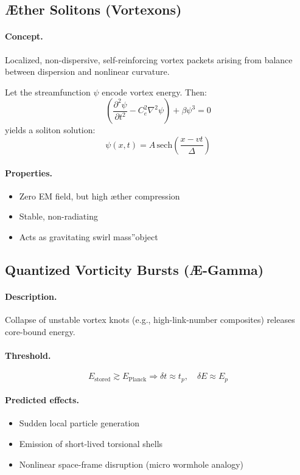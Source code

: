 \documentclass[12pt]{article}
\begin{document}
\subsection{Æther Solitons (Vortexons)}

\paragraph{Concept.} Localized, non-dispersive, self-reinforcing vortex packets arising from balance between dispersion and nonlinear curvature.

Let the streamfunction \( \psi \) encode vortex energy. Then:
\[
\left( \frac{\partial^2 \psi}{\partial t^2}
- C_e^2 \nabla^2 \psi \right) + \beta \psi^3 = 0
\]
yields a soliton solution:
\[
\psi(x,t) = A\,\text{sech}\left( \frac{x - v t}{\Delta} \right)
\]

\paragraph{Properties.}
\begin{itemize}
  \item Zero EM field, but high \ae{}ther compression
  \item Stable, non-radiating
  \item Acts as gravitating \grqq swirl mass\textquotedblright object
\end{itemize}

\subsection{Quantized Vorticity Bursts (Æ-Gamma)}

\paragraph{Description.} Collapse of unstable vortex knots (e.g., high-link-number composites) releases core-bound energy.

\paragraph{Threshold.}
\[
E_\text{stored} \gtrsim E_\text{Planck} \Rightarrow \delta t \approx t_p,\quad \delta E \approx E_p
\]

\paragraph{Predicted effects.}
\begin{itemize}
  \item Sudden local particle generation
  \item Emission of short-lived torsional shells
  \item Nonlinear space-frame disruption (micro wormhole analogy)
\end{itemize}
\end{document}
